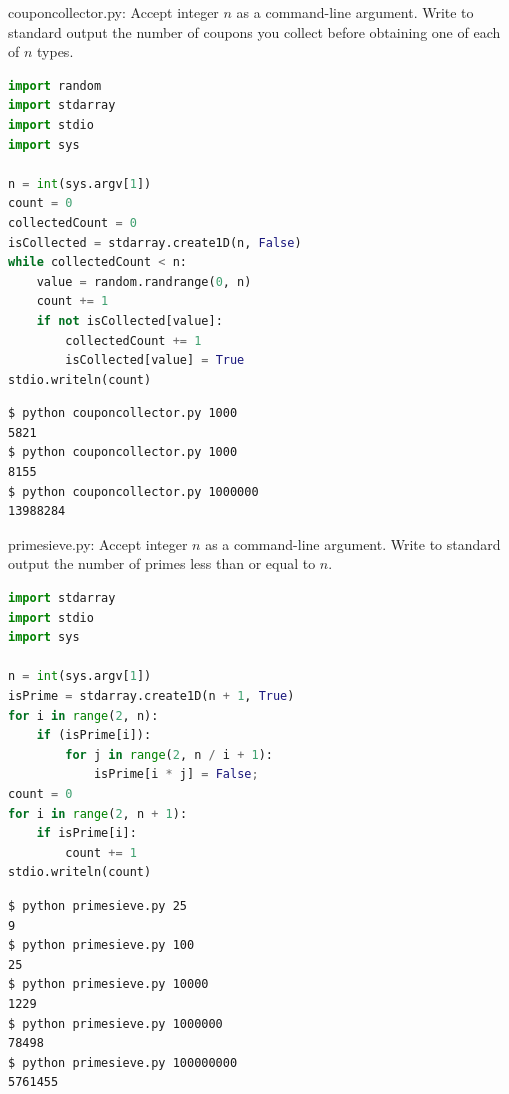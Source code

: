 \documentclass[8pt,a4paper,compress,handout]{beamer}
\begin{document}
\begin{frame}[fragile]
\begin{framed}
\tiny couponcollector.py: Accept integer $n$ as a command-line argument. Write to standard output the number of coupons you collect before obtaining one of each of $n$ types.
\end{framed}

\begin{lstlisting}[language=Python]
import random
import stdarray
import stdio
import sys

n = int(sys.argv[1])
count = 0
collectedCount = 0
isCollected = stdarray.create1D(n, False)
while collectedCount < n:
    value = random.randrange(0, n)
    count += 1
    if not isCollected[value]:
        collectedCount += 1
        isCollected[value] = True
stdio.writeln(count)
\end{lstlisting}

\begin{lstlisting}[language={}]
$ python couponcollector.py 1000
5821
$ python couponcollector.py 1000
8155
$ python couponcollector.py 1000000
13988284
\end{lstlisting}
\end{frame}

\begin{frame}[fragile]
\begin{framed}
\tiny primesieve.py: Accept integer $n$ as a command-line argument. Write to standard output the number of primes less than or equal to $n$.
\end{framed}

\begin{lstlisting}[language=Python]
import stdarray
import stdio
import sys

n = int(sys.argv[1])
isPrime = stdarray.create1D(n + 1, True)
for i in range(2, n):
    if (isPrime[i]):
        for j in range(2, n / i + 1):
            isPrime[i * j] = False;
count = 0
for i in range(2, n + 1):
    if isPrime[i]:
        count += 1
stdio.writeln(count)
\end{lstlisting}

\begin{lstlisting}[language={}]
$ python primesieve.py 25
9
$ python primesieve.py 100
25
$ python primesieve.py 10000
1229
$ python primesieve.py 1000000
78498
$ python primesieve.py 100000000
5761455
\end{lstlisting}
\end{frame}
\end{document}
